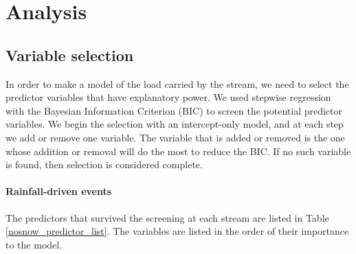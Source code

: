 \documentclass[10pt]{article}
\begin{document}
\section{Analysis}

\subsection{Variable selection}
In order to make a model of the load carried by the stream, we need to select the predictor variables that have explanatory power. We used stepwise regression with the Bayesian Information Criterion (BIC) to screen the potential predictor variables. We begin the selection with an intercept-only model, and at each step we add or remove one variable. The variable that is added or removed is the one whose addition or removal will do the most to reduce the BIC. If no such variable is found, then selection is considered complete.\\

\paragraph{Rainfall-driven events}

The predictors that survived the screening at each stream are listed in Table \ref{nosnow_predictor_list}. The variables are listed in the order of their importance to the model.\\
\end{document}

